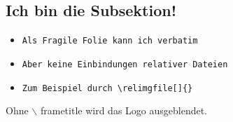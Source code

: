 \subsection{Ich bin die Subsektion!}

\begin{frame}[fragile]
    \begin{itemize}
        \item \verb#Als Fragile Folie kann ich verbatim#
        \item \verb#Aber keine Einbindungen relativer Dateien#
        \item \verb#Zum Beispiel durch \relimgfile[]{}#
    \end{itemize}
\end{frame}

\begin{frame}
    Ohne $\backslash$ frametitle wird das Logo ausgeblendet.
\end{frame}

\begin{frame}
    
\end{frame}

